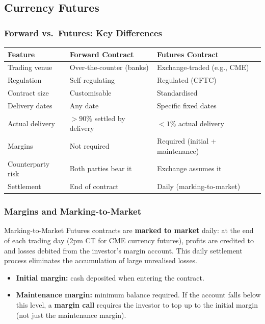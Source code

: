\documentclass[11pt,a4paper]{article}
\begin{document}
\subsection{Currency Futures}

\subsubsection{Forward vs.\ Futures: Key Differences}

\begin{center}
\begin{tabular}{lll}
\toprule
\textbf{Feature} & \textbf{Forward Contract} & \textbf{Futures Contract} \\
\midrule
Trading venue & Over-the-counter (banks) & Exchange-traded (e.g., CME) \\
Regulation & Self-regulating & Regulated (CFTC) \\
Contract size & Customisable & Standardised \\
Delivery dates & Any date & Specific fixed dates \\
Actual delivery & $>90\%$ settled by delivery & $<1\%$ actual delivery \\
Margins & Not required & Required (initial + maintenance) \\
Counterparty risk & Both parties bear it & Exchange assumes it \\
Settlement & End of contract & Daily (marking-to-market) \\
\bottomrule
\end{tabular}
\end{center}

\subsubsection{Margins and Marking-to-Market}

\begin{conceptbox}{Marking-to-Market}
Futures contracts are \textbf{marked to market} daily: at the end of each trading day (2pm CT for CME currency futures), profits are credited to and losses debited from the investor's margin account. This daily settlement process eliminates the accumulation of large unrealised losses.

\begin{itemize}
  \item \textbf{Initial margin:} cash deposited when entering the contract.
  \item \textbf{Maintenance margin:} minimum balance required. If the account falls below this level, a \textbf{margin call} requires the investor to top up to the initial margin (not just the maintenance margin).
\end{itemize}
\end{conceptbox}
\end{document}

